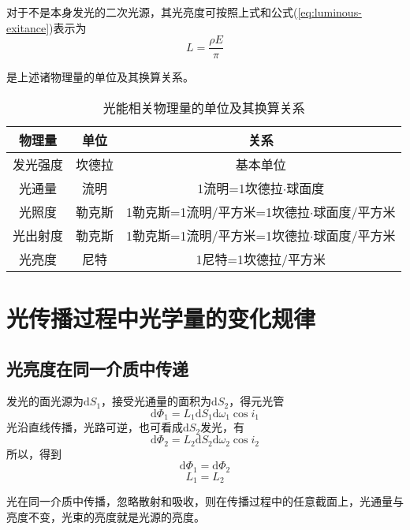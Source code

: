 \documentclass[cn,10pt,chinesefont=founder,math=mtpro2,cite=super,toc=onecol,twoside,openany]{elegantbook}
\begin{document}
对于不是本身发光的二次光源，其光亮度可按照上式和公式(\ref{eq:luminous-exitance})表示为
\begin{equation}
L=\frac{\rho E}{\pi}
\end{equation}

 是上述诸物理量的单位及其换算关系。
\begin{table}[htbp]
	\centering
	\caption{光能相关物理量的单位及其换算关系}
	\begin{tabular}{ccc}
		\toprule
		物理量  & 单位  & 关系  \\
		\midrule
		发光强度 & 坎德拉 & 基本单位  \\
		光通量  & 流明  & 1流明=1坎德拉$\cdot$球面度  \\
		光照度  & 勒克斯 & 1勒克斯=1流明/平方米=1坎德拉$\cdot$球面度/平方米 \\
		光出射度 & 勒克斯 & 1勒克斯=1流明/平方米=1坎德拉$\cdot$球面度/平方米 \\
		光亮度  & 尼特  & 1尼特=1坎德拉/平方米 \\
		\bottomrule
	\end{tabular}
    \label{tab:optical-energy-physical-quantity}
\end{table}


\section{光传播过程中光学量的变化规律}
\subsection{光亮度在同一介质中传递}
发光的面光源为$\mathrm{d}S_1$，接受光通量的面积为$\mathrm{d}S_2$，得元光管
\begin{equation}
\mathrm{d}\varPhi_1=L_1\mathrm{d}S_1\mathrm{d}\omega_1\cos i_1
\end{equation}
光沿直线传播，光路可逆，也可看成$\mathrm{d}S_2$发光，有
\begin{equation}
\mathrm{d}\varPhi_2=L_2\mathrm{d}S_2\mathrm{d}\omega_2\cos i_2
\end{equation}
所以，得到
\begin{equation}
\mathrm{d}\varPhi_1=\mathrm{d}\varPhi_2
\end{equation}
\begin{equation}
L_1=L_2
\end{equation}
\begin{conclusion}
光在同一介质中传播，忽略散射和吸收，则在传播过程中的任意截面上，光通量与亮度不变，光束的亮度就是光源的亮度。
\end{conclusion}
\end{document}

